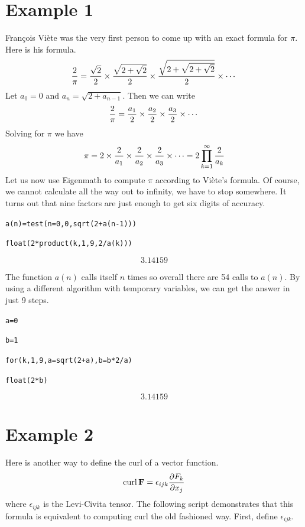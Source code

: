 \documentclass[12pt,openany]{report}
\begin{document}
\section*{Example 1}
Fran\c cois Vi\`ete was the very first person to come up with an exact formula for $\pi$.
Here is his formula.
\begin{displaymath}
{2\over\pi}={\sqrt2\over2}\times{\sqrt{2+\sqrt2}\over2}\times
{\sqrt{2+\sqrt{2+\sqrt2}}\over2}\times\cdots
\end{displaymath}
Let $a_0=0$ and $a_{n}=\sqrt{2+a_{n-1}}$.
Then we can write
\begin{displaymath}
{2\over\pi}={a_1\over2}\times{a_2\over2}\times
{a_3\over2}\times\cdots
\end{displaymath}
%
Solving for $\pi$ we have
\begin{displaymath}
\pi=2\times{2\over a_1}\times{2\over a_2}\times{2\over a_3}\times\cdots=2\prod_{k=1}^\infty
{2\over a_k}
\end{displaymath}
%
Let us now use Eigenmath to compute $\pi$ according to Vi\`ete's formula.
Of course, we cannot calculate all the way out to infinity, we have to stop somewhere.
It turns out that nine factors are just enough to get six digits of accuracy.

\medskip
{\tt a(n)=test(n=0,0,sqrt(2+a(n-1)))}

{\tt float(2*product(k,1,9,2/a(k)))}

$$3.14159$$

\medskip
\noindent
The function $a(n)$ calls itself $n$ times so overall there are
54 calls to $a(n)$.
By using a different algorithm with temporary variables, we can get the answer in just 9 steps.

\medskip
{\tt a=0}

{\tt b=1}

{\tt for(k,1,9,a=sqrt(2+a),b=b*2/a)}

{\tt float(2*b)}

$$3.14159$$

\newpage

\label{example2}

\section*{Example 2}
Here is another way to define the curl of a vector function.
$$\mathop{\rm curl}{\bf F}=\epsilon_{ijk}{\partial F_k\over\partial x_j}$$
where $\epsilon_{ijk}$ is the Levi-Civita tensor.
The following script demonstrates that this formula is equivalent
to computing curl the old fashioned way.
First, define $\epsilon_{ijk}$.
\end{document}
